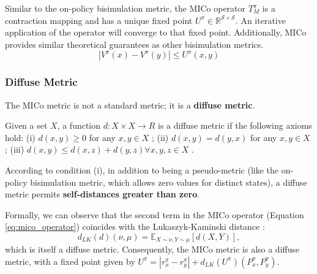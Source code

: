 Similar to the on-policy bisimulation metric, the MICo operator $T^\pi_M$ is a contraction mapping and has a unique fixed point $U^\pi \in \mathbb{R}^{\mathcal{S} \times \mathcal{S}}$. An iterative application of the operator will converge to that fixed point. Additionally, MICo provides similar theoretical guarantees as other bisimulation metrics.
\begin{equation}
    | V^\pi(x) -V^\pi(y) | \leq U^\pi(x,y)
\end{equation}



\subsubsection{Diffuse Metric}

The MICo metric is not a standard metric; it is a \textbf{diffuse metric}.

\begin{definition} 
\label{def:diffuse_metric}
    Given a set $X$, a function $d : X \times X \rightarrow R$ is a diffuse metric if the following axioms hold: (i) $d(x, y) \geq 0$ for any $x, y \in X$ ; (ii) $d(x, y) = d(y, x)$ for any $x, y \in X$ ; (iii) $d(x, y) \leq d(x, z) + d(y, z) \forall x, y, z \in X$ .
\end{definition}

According to condition (i), in addition to being a pseudo-metric (like the on-policy bisimulation metric, which allows zero values for distinct states), a diffuse metric permits \textbf{self-distances greater than zero}.

Formally, we can observe that the second term in the MICo operator (Equation \ref{eq:mico_operator}) coincides with the Lukaszyk-Kaminski distance \cite{lukaszyk2004new}:
\begin{equation}
    d_{LK}(d)(\nu, \mu) = \mathbb{E}_{X \sim \nu, Y \sim \mu}[d(X,Y)],
\end{equation}
which is itself a diffuse metric. Consequently, the MICo metric is also a diffuse metric, with a fixed point given by $U^\pi = |r^\pi_x - r^\pi_y | + d_{LK}(U^\pi)(P^\pi_x, P^\pi_y)$.


